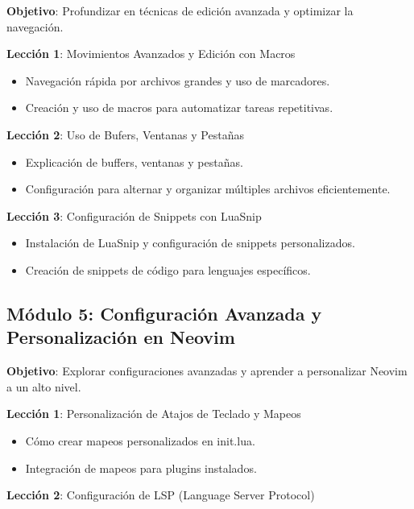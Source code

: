 \documentclass[
  a4paper,
  DIV=11,
  numbers=noendperiod,
  onepage,
  openany]{scrreprt}
\begin{document}
\textbf{Objetivo}: Profundizar en técnicas de edición avanzada y
optimizar la navegación.

\textbf{Lección 1}: Movimientos Avanzados y Edición con Macros

\begin{itemize}
\item
  Navegación rápida por archivos grandes y uso de marcadores.
\item
  Creación y uso de macros para automatizar tareas repetitivas.
\end{itemize}

\textbf{Lección 2}: Uso de Bufers, Ventanas y Pestañas

\begin{itemize}
\item
  Explicación de buffers, ventanas y pestañas.
\item
  Configuración para alternar y organizar múltiples archivos
  eficientemente.
\end{itemize}

\textbf{Lección 3}: Configuración de Snippets con LuaSnip

\begin{itemize}
\item
  Instalación de LuaSnip y configuración de snippets personalizados.
\item
  Creación de snippets de código para lenguajes específicos.
\end{itemize}

\subsection{\texorpdfstring{\textbf{Módulo 5}: Configuración Avanzada y
Personalización en
Neovim}{Módulo 5: Configuración Avanzada y Personalización en Neovim}}\label{muxf3dulo-5-configuraciuxf3n-avanzada-y-personalizaciuxf3n-en-neovim}

\textbf{Objetivo}: Explorar configuraciones avanzadas y aprender a
personalizar Neovim a un alto nivel.

\textbf{Lección 1}: Personalización de Atajos de Teclado y Mapeos

\begin{itemize}
\item
  Cómo crear mapeos personalizados en init.lua.
\item
  Integración de mapeos para plugins instalados.
\end{itemize}

\textbf{Lección 2}: Configuración de LSP (Language Server Protocol)
\end{document}
